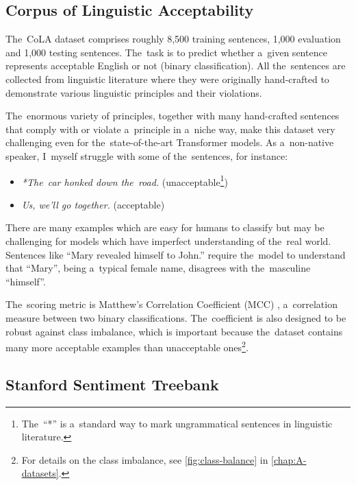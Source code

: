 \documentclass[bsc,frontabs,singlespacing,parskip,deptreport]{infthesis}
\begin{document}
{{    \subsection{Corpus of Linguistic Acceptability}{
      \label{sec:datasets-CoLA}

      The~CoLA dataset \citep{CoLA-paper} comprises roughly 8,500 training sentences, 1,000 evaluation and 1,000 testing sentences.
      The~task is to predict whether a~given sentence represents acceptable English or not (binary classification).
      All the~sentences are collected from linguistic literature where they were originally hand-crafted to demonstrate various linguistic principles and their violations.
      
      The~enormous variety of principles, together with many hand-crafted sentences that comply with or violate a~principle in a~niche way, make this dataset very challenging even for the~state-of-the-art Transformer models. 
      As a~non-native speaker, I~myself struggle with some of the~sentences, for instance:
      \begin{itemize}
        \item \textit{*The~car honked down the~road.} (unacceptable\footnote{The~``*'' is a~standard way to mark ungrammatical sentences in linguistic literature.})
        \item \textit{Us, we'll go together.} (acceptable)
      \end{itemize}

      There are many examples which are easy for humans to classify but may be challenging for models which have imperfect understanding of the~real world. Sentences like ``Mary revealed himself to John.'' require the~model to understand that ``Mary'', being a~typical female name, disagrees with the~masculine ``himself''.
      
      The~scoring metric is Matthew's Correlation Coefficient (MCC) \citep{Matthews_1975}, a~correlation measure between two binary classifications. The~coefficient is also designed to be robust against class imbalance, which is important because the~dataset contains many more acceptable examples than unacceptable ones\footnote{For details on the class imbalance, see \autoref{fig:class-balance} in \autoref{chap:A-datasets}.}.
    }

    \subsection{Stanford Sentiment Treebank}{
      \label{sec:datasets-SST-2}

}}}
\end{document}

